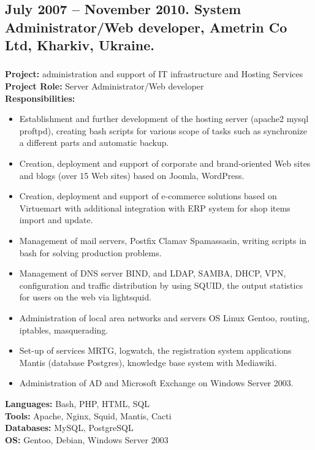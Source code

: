 \documentclass[letterpaper]{article}
\begin{document}
\subsection{July 2007 – November 2010. System Administrator/Web developer, Ametrin Co Ltd, Kharkiv, Ukraine.}
\label{sec-2-2}
\subsubsection{}
\label{sec-2-2-1}
\textbf{Project:} administration and support of IT infrastructure and Hosting Services\\
\textbf{Project Role:}  Server Administrator/Web developer\\
\textbf{Responsibilities:}\\
\begin{itemize}
\item Establishment and further development of the hosting server (apache2 mysql proftpd), creating bash scripts for various scope of tasks such as synchronize a different parts and automatic backup.
\item Creation, deployment and support of corporate and brand-oriented Web sites and blogs (over 15 Web sites) based on Joomla, WordPress.
\item Creation, deployment and support of e-commerce solutions based on Virtuemart with additional integration with ERP system for shop items import and update.
\item Management of mail servers, Postfix Clamav Spamassasin, writing scripts in bash for solving production problems.
\item Management of DNS server BIND, and LDAP, SAMBA, DHCP, VPN, configuration and traffic distribution by using SQUID, the output statistics for users on the web via lightsquid.
\item Administration of local area networks and servers OS Linux Gentoo, routing, iptables, masquerading.
\item Set-up of services MRTG, logwatch, the registration system applications Mantis (database Postgres), knowledge base system with Mediawiki.
\item Administration of AD and Microsoft Exchange on Windows Server 2003.
\end{itemize}
\textbf{Languages:} Bash, PHP,  HTML, SQL\\
\textbf{Tools:}  Apache, Nginx, Squid, Mantis, Cacti\\
\textbf{Databases:} MySQL, PostgreSQL\\
\textbf{OS:} Gentoo, Debian, Windows Server 2003\\
\end{document}

